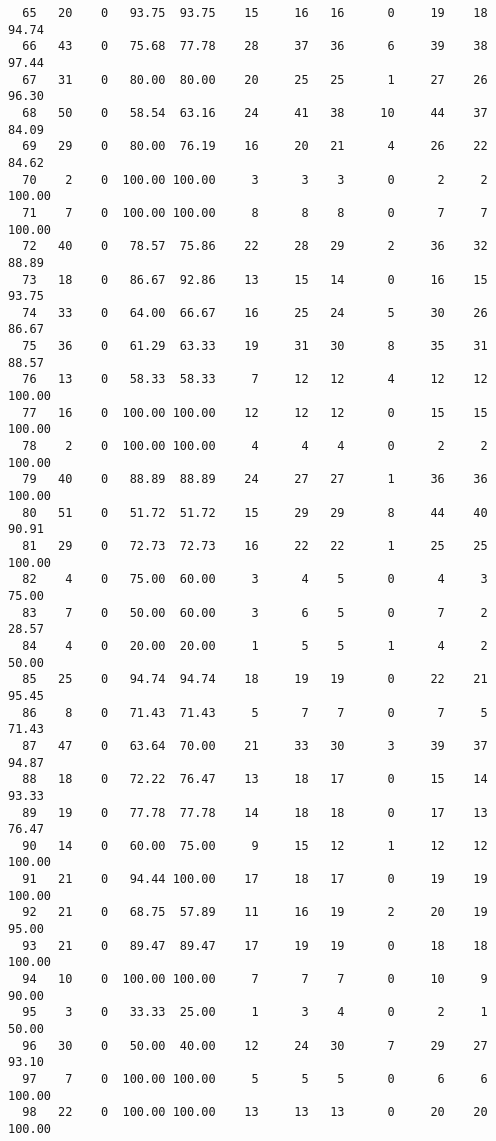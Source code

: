 \begin{verbatim}
  65   20    0   93.75  93.75    15     16   16      0     19    18    94.74
  66   43    0   75.68  77.78    28     37   36      6     39    38    97.44
  67   31    0   80.00  80.00    20     25   25      1     27    26    96.30
  68   50    0   58.54  63.16    24     41   38     10     44    37    84.09
  69   29    0   80.00  76.19    16     20   21      4     26    22    84.62
  70    2    0  100.00 100.00     3      3    3      0      2     2   100.00
  71    7    0  100.00 100.00     8      8    8      0      7     7   100.00
  72   40    0   78.57  75.86    22     28   29      2     36    32    88.89
  73   18    0   86.67  92.86    13     15   14      0     16    15    93.75
  74   33    0   64.00  66.67    16     25   24      5     30    26    86.67
  75   36    0   61.29  63.33    19     31   30      8     35    31    88.57
  76   13    0   58.33  58.33     7     12   12      4     12    12   100.00
  77   16    0  100.00 100.00    12     12   12      0     15    15   100.00
  78    2    0  100.00 100.00     4      4    4      0      2     2   100.00
  79   40    0   88.89  88.89    24     27   27      1     36    36   100.00
  80   51    0   51.72  51.72    15     29   29      8     44    40    90.91
  81   29    0   72.73  72.73    16     22   22      1     25    25   100.00
  82    4    0   75.00  60.00     3      4    5      0      4     3    75.00
  83    7    0   50.00  60.00     3      6    5      0      7     2    28.57
  84    4    0   20.00  20.00     1      5    5      1      4     2    50.00
  85   25    0   94.74  94.74    18     19   19      0     22    21    95.45
  86    8    0   71.43  71.43     5      7    7      0      7     5    71.43
  87   47    0   63.64  70.00    21     33   30      3     39    37    94.87
  88   18    0   72.22  76.47    13     18   17      0     15    14    93.33
  89   19    0   77.78  77.78    14     18   18      0     17    13    76.47
  90   14    0   60.00  75.00     9     15   12      1     12    12   100.00
  91   21    0   94.44 100.00    17     18   17      0     19    19   100.00
  92   21    0   68.75  57.89    11     16   19      2     20    19    95.00
  93   21    0   89.47  89.47    17     19   19      0     18    18   100.00
  94   10    0  100.00 100.00     7      7    7      0     10     9    90.00
  95    3    0   33.33  25.00     1      3    4      0      2     1    50.00
  96   30    0   50.00  40.00    12     24   30      7     29    27    93.10
  97    7    0  100.00 100.00     5      5    5      0      6     6   100.00
  98   22    0  100.00 100.00    13     13   13      0     20    20   100.00

\end{verbatim}
